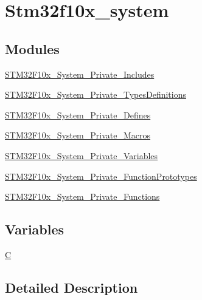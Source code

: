 \hypertarget{group__stm32f10x__system}{\section{Stm32f10x\-\_\-system}
\label{group__stm32f10x__system}
}
\subsection*{Modules}
\begin{DoxyCompactItemize}
\item 
\hyperlink{group___s_t_m32_f10x___system___private___includes}{S\-T\-M32\-F10x\-\_\-\-System\-\_\-\-Private\-\_\-\-Includes}
\item 
\hyperlink{group___s_t_m32_f10x___system___private___types_definitions}{S\-T\-M32\-F10x\-\_\-\-System\-\_\-\-Private\-\_\-\-Types\-Definitions}
\item 
\hyperlink{group___s_t_m32_f10x___system___private___defines}{S\-T\-M32\-F10x\-\_\-\-System\-\_\-\-Private\-\_\-\-Defines}
\item 
\hyperlink{group___s_t_m32_f10x___system___private___macros}{S\-T\-M32\-F10x\-\_\-\-System\-\_\-\-Private\-\_\-\-Macros}
\item 
\hyperlink{group___s_t_m32_f10x___system___private___variables}{S\-T\-M32\-F10x\-\_\-\-System\-\_\-\-Private\-\_\-\-Variables}
\item 
\hyperlink{group___s_t_m32_f10x___system___private___function_prototypes}{S\-T\-M32\-F10x\-\_\-\-System\-\_\-\-Private\-\_\-\-Function\-Prototypes}
\item 
\hyperlink{group___s_t_m32_f10x___system___private___functions}{S\-T\-M32\-F10x\-\_\-\-System\-\_\-\-Private\-\_\-\-Functions}
\end{DoxyCompactItemize}
\subsection*{Variables}
\begin{DoxyCompactItemize}
\item 
\hyperlink{group__stm32f10x__system_gaaa53ca0b650dfd85c4f59fa156f7a2cc}{C}
\end{DoxyCompactItemize}


\subsection{Detailed Description}


